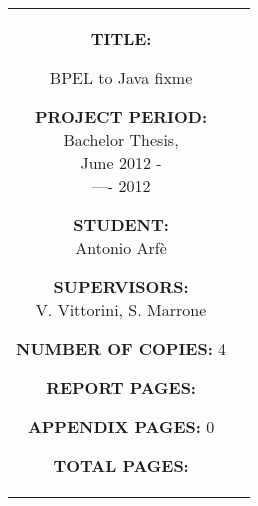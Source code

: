 \documentclass[a4paper,11pt]{article}
\begin{document}
\begin{titlepage}
\begin{nopagebreak}
{\begin{tabular}{cc}
{\begin{description}
\item {\bf TITLE:}

BPEL to Java fixme

\end{description}

\parbox{8cm}{

\begin{description}
         \item {\bf PROJECT PERIOD:}\\
           Bachelor Thesis, \\
            June 2012 -\\---- 2012\\
           \hspace{4cm}
         \item {\bf STUDENT:}\\
           Antonio Arfè\\
           \hspace{2cm}
         \item {\bf SUPERVISORS:}\\
           V. Vittorini, S. Marrone
\end{description}
}

\begin{description}
        \item {\bf NUMBER OF COPIES:} 4
        \item {\bf REPORT PAGES:} \pageref{report_end}
        \item {\bf APPENDIX PAGES:} 0
        \item {\bf TOTAL PAGES:} \pageref{LastPage}
\end{description}
\vfill } &
\parbox{7cm}{
  \vspace{.15cm}
  \flushright
}
\end{tabular}
}


\end{nopagebreak}
\end{titlepage}
\end{document}
